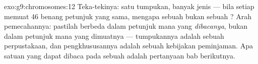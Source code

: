 \begin{solution}{exo:g9:chromosomes:12}
Teka-tekinya: satu tumpukan, banyak jenis  --- bila
setiap  memuat 46 benang petunjuk yang sama, mengapa
sebuah  bukan sebuah  ? Arah pemecahannya: 
pastilah berbeda dalam petunjuk mana yang \emph{dibacanya},
bukan dalam petunjuk mana yang dimuatnya --- tumpukannya
adalah sebuah perpustakaan, dan pengkhususannya adalah
sebuah kebijakan peminjaman. Apa satuan yang dapat dibaca
pada sebuah  adalah pertanyaan bab berikutnya.
\end{solution}

